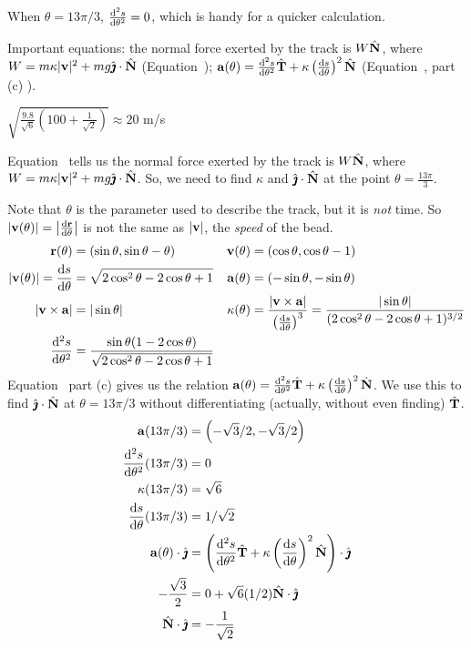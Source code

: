 \begin{hint}
When $\theta=13\pi/3$, $\frac{\mathrm{d}^2s}{\mathrm{d}{\theta}^2}=0$, which is handy for a quicker calculation.


Important equations: the normal force exerted by the track is $W\hat{\mathbf{N}}$, where\\
$W=m\kappa|\mathbf{v}|^2+mg\hat{\pmb{\jmath}}\cdot\hat{\mathbf{N}}$ (Equation~);\quad
$\va(\theta)=\ddiff{2}{s}{\theta}\hT+\kappa\left(\diff{s}{\theta}\right)^2\hN$ (Equation~, part (c) ). 
\end{hint}
\begin{answer}
$\sqrt{\frac{9.8}{\sqrt 6}\left(100+\frac1{\sqrt2} \right)}\approx 20 $ m/s
\end{answer}
\begin{solution}
Equation~ tells us the normal force exerted by the track is $W\hat{\mathbf{N}}$, where
$W=m\kappa|\mathbf{v}|^2+mg\hat{\pmb{\jmath}}\cdot\hat{\mathbf{N}}$. So, we need to find $\kappa$ and $\hat{\pmb{\jmath}} \cdot \hat{\mathbf{N}}$ at the point $\theta=\frac{13\pi}{3}$.

Note that $\theta$ is the parameter used to describe the track, but it is \emph{not} time. So $|\vv(\theta)|=\left|\diff{\vr}{\theta} \right|$ is not the same as $|\mathbf{v}|$, the \emph{speed} of the bead.
\begin{align*}
\vr(\theta)&=(\sin \theta , \sin \theta - \theta)&
\vv(\theta)&=(\cos \theta, \cos \theta -1) \\ |\vv(\theta)|=\diff{s}{\theta}&=\sqrt{2\cos^2\theta-2\cos \theta+1}&
\va(\theta)&=(-\sin \theta, -\sin \theta) \\ |\vv \times \va|&=|\sin \theta|&
\ka(\theta)&=\frac{|\vv\times\va|}{\left(\diff{s}{\theta}\right)^3}=\frac{|\sin \theta|}{(2\cos^2\theta-2\cos \theta+1)^{3/2}}\\
\ddiff{2}{s}{\theta}&=\frac{\sin \theta (1-2\cos \theta)}{\sqrt{2\cos^2\theta-2\cos \theta+1}}
\end{align*}
Equation~ part (c) gives us the relation $\va(\theta)=\ddiff{2}{s}{\theta}\hT+\kappa\left(\diff{s}{\theta}\right)^2\hN$. We use this to find $\hat{\pmb{\jmath}}\cdot\hat{\mathbf{N}}$ at $\theta=13\pi/3$ without differentiating (actually, without even finding) $\hat{\mathbf{T}}$.
\begin{align*}
\va(13\pi/3)&=\left(-\sqrt{3}/2,-\sqrt{3}/2\right)\\
\ddiff{2}{s}{\theta}(13\pi/3)&=0\\
\ka(13\pi/3)&=\sqrt{6}\\
\diff{s}{\theta}(13\pi/3)&=1/\sqrt{2}\\
\va(\theta)\cdot\hj&=\left(\ddiff{2}{s}{\theta}\hT+\kappa\left(\diff{s}{\theta}\right)^2\hN\right)\cdot\hj\\
-\frac{\sqrt 3}{2}&=0+\sqrt{6}(1/2)\hN\cdot\hj\\
\hN\cdot\hj&=-\frac{1}{\sqrt2}
\end{align*}


\end{solution}
